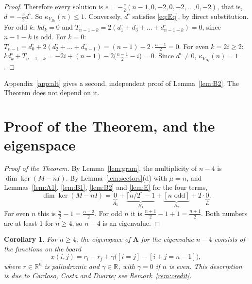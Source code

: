 \documentclass[11pt]{amsart}
\theoremstyle{plain}
\newtheorem{corollary}[lemma]{Corollary}
\theoremstyle{definition}
\theoremstyle{remark}
\numberwithin{equation}{section}
\newcommand{\Adj}{\mathbf{A}}          %
\newcommand{\R}{\mathbb{R}}
\newcommand{\iv}[1]{[#1]}              %
\newcommand{\dc}{d^{\circ}}
\newcommand{\VBb}{V_{B_2}}
\begin{document}
\begin{proof}
Therefore every solution is \(e=-\frac c2(n-1,0,-2,0,-2,\dots,0,-2)\), that is,
\(d=-\frac c2\dc\). So \(\kappa_{\VBb}(n)\le1\). Conversely, \(\dc\) satisfies
\eqref{eq:Eq}, by direct substitution. For odd \(k\): \(k\dc_k=0\) and
\(T_{n-1-k}=2(\dc_1+\dc_3+\dots+\dc_{n-1-k})=0\), since \(n-1-k\) is odd. For \(k=0\):
\(T_{n-1}=\dc_0+2(\dc_2+\dots+\dc_{n-1})=(n-1)-2\cdot\frac{n-1}2=0\). For even
\(k=2i\ge2\): \(k\dc_k+T_{n-1-k}=-2i+(n-1)-2\bigl(\frac{n-1}2-i\bigr)=0\). Since
\(\dc\ne0\), \(\kappa_{\VBb}(n)=1\).
\end{proof}

Appendix~\ref{app:alt} gives a second, independent proof of Lemma~\ref{lem:B2}. The
Theorem does not depend on it.

\section{Proof of the Theorem, and the eigenspace}\label{sec:main}

\begin{proof}[Proof of the Theorem]
By Lemma~\ref{lem:gram}, the multiplicity of \(n-4\) is \(\dim\ker(M-nI)\). By
Lemma~\ref{lem:sectors}(d) with \(\mu=n\), and Lemmas~\ref{lem:A1}, \ref{lem:B1},
\ref{lem:B2} and \ref{lem:E} for the four terms,
\[
\dim\ker(M-nI)=\underbrace{0}_{A_1}+\underbrace{\lceil n/2\rceil-1}_{B_1}
+\underbrace{\iv{n\text{ odd}}}_{B_2}+2\cdot\underbrace{0}_{E}.
\]
For even \(n\) this is \(\frac n2-1=\frac{n-2}2\). For odd \(n\) it is
\(\frac{n+1}2-1+1=\frac{n+1}2\). Both numbers are at least \(1\) for \(n\ge4\), so
\(n-4\) is an eigenvalue.
\end{proof}

\begin{corollary}\label{cor:eigenspace}
For \(n\ge4\), the eigenspace of \(\Adj\) for the eigenvalue \(n-4\) consists of the
functions on the board
\[
x(i,j)=r_i-r_j+\gamma\bigl(\iv{i=j}-\iv{i+j=n-1}\bigr),
\]
where \(r\in\R^n\) is palindromic and \(\gamma\in\R\), with \(\gamma=0\) if \(n\) is even.
This description is due to Cardoso, Costa and Duarte; see Remark~\ref{rem:credit}.
\end{corollary}
\end{document}

